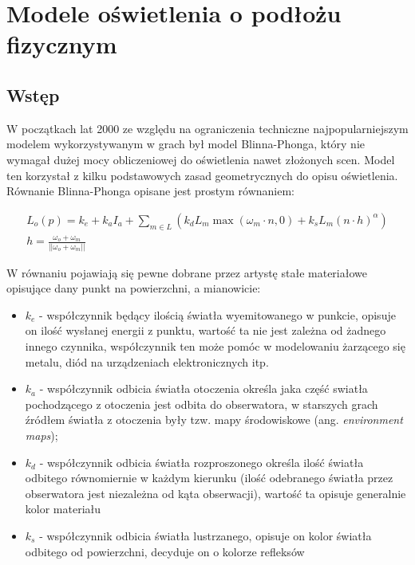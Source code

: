 \documentclass[../main.tex]{subfiles}
\begin{document}
\chapter{Modele oświetlenia o podłożu fizycznym}

\section{Wstęp}

W początkach lat 2000 ze względu na ograniczenia techniczne najpopularniejszym
modelem wykorzystywanym w grach był model Blinna-Phonga, który nie wymagał
dużej mocy obliczeniowej do oświetlenia nawet złożonych scen. Model ten
korzystał z kilku podstawowych zasad geometrycznych do opisu oświetlenia.
Równanie Blinna-Phonga opisane jest prostym równaniem:

\begin{gather*}
  L_o(p) = k_e + k_a I_a +
    \sum_{m \in L} \left( {
      k_d L_m \max\left({ \omega_m \cdot n, 0 }\right) +
      k_s L_m (n \cdot h)^{\alpha}
    } \right) \\
    h = \frac{\omega_o+\omega_m}{||\omega_o+\omega_m||}
\end{gather*}

W równaniu pojawiają się pewne dobrane przez artystę stałe materiałowe
opisujące dany punkt na powierzchni, a mianowicie:

\begin{itemize}
\item $k_e$ - współczynnik będący ilością światła wyemitowanego w punkcie,
  opisuje on ilość wysłanej energii z punktu, wartość ta nie jest zależna
  od żadnego innego czynnika, współczynnik ten może pomóc w modelowaniu
  żarzącego się metalu, diód na urządzeniach elektronicznych itp.

\item $k_a$ - współczynnik odbicia światła otoczenia określa jaka część swiatła
  pochodzącego z otoczenia jest odbita do obserwatora, w starszych grach źródłem
  światła z otoczenia były tzw. mapy środowiskowe (ang. \textit{environment
  maps});

\item $k_d$ - współczynnik odbicia światła rozproszonego określa ilość światła
  odbitego równomiernie w każdym kierunku (ilość odebranego światła przez
  obserwatora jest niezależna od kąta obserwacji), wartość ta opisuje generalnie
  kolor materiału

\item $k_s$ - współczynnik odbicia światła lustrzanego, opisuje on kolor światła
  odbitego od powierzchni, decyduje on o kolorze refleksów

\end{itemize}
\end{document}
